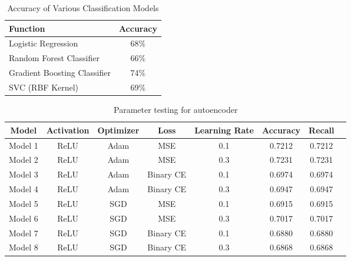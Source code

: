 \begin{table}[H]
    \centering
    \begin{tabular}{|l|c|}
        \hline
        \textbf{Function} & \textbf{Accuracy} \\
        \hline
        Logistic Regression & 68\% \\
        Random Forest Classifier & 66\% \\
        Gradient Boosting Classifier & 74\% \\
        SVC (RBF Kernel) & 69\% \\
        \hline
    \end{tabular}
    \caption{Accuracy of Various Classification Models}
    \label{tab:alg}
\end{table}


\begin{table}[H]
    \centering
    \begin{tabularx}{\textwidth}{|c|c|c|c|c|c|c|c|}
        \hline
        \rowcolor{lightgreen}
        \textbf{Model} & \textbf{Activation} & \textbf{Optimizer} & \textbf{Loss} & \textbf{Learning Rate} & \textbf{Accuracy} & \textbf{Recall} \\
        \hline
        Model 1 & ReLU & Adam & MSE & 0.1 & 0.7212 & 0.7212 \\
        \hline
        Model 2 & ReLU & Adam & MSE & 0.3 & 0.7231 & 0.7231 \\
        \hline
        Model 3 & ReLU & Adam & Binary CE & 0.1 & 0.6974 & 0.6974 \\
        \hline
        Model 4 & ReLU & Adam & Binary CE & 0.3 & 0.6947 & 0.6947 \\
        \hline
        Model 5 & ReLU & SGD & MSE & 0.1 & 0.6915 & 0.6915 \\
        \hline
        Model 6 & ReLU & SGD & MSE & 0.3 & 0.7017 & 0.7017 \\
        \hline
        Model 7 & ReLU & SGD & Binary CE & 0.1 & 0.6880 & 0.6880 \\
        \hline
        Model 8 & ReLU & SGD & Binary CE & 0.3 & 0.6868 & 0.6868 \\
        \hline
    \end{tabularx}
    \caption{Parameter testing for autoencoder}
    \label{tab:op1}
\end{table}
